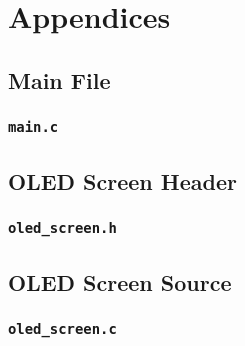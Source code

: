 \section{Appendices}

\subsection{Main File}
\subsubsection{\texttt{main.c}}


\subsection{OLED Screen Header}
\subsubsection{\texttt{oled\_screen.h}}


\subsection{OLED Screen Source}
\subsubsection{\texttt{oled\_screen.c}}
